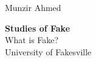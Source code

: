 \begin{titlepage} 
\AddToShipoutPictureBG*{\AtPageLowerLeft{%
  \color{accentcolour!75}\rule{.1\paperwidth}{\paperheight}}}
	\raggedright %

	\vspace*{\baselineskip} 
        
	\vspace{40mm}
        \hspace{15mm}
	{\Large Munzir Ahmed} 
	
	\vspace*{0.167\textheight} 
        \hspace{15mm}
	\textbf{\LARGE Studies of Fake}\\[\baselineskip] 
	\hspace{15mm}
	{\textcolor{accentcolour}{\Huge What is Fake?}}\\[\baselineskip] 
	\hspace{15mm}
	{\Large University of Fakesville}
	
	\vfill 

	
	\date{\today} 
	
	\vspace*{3\baselineskip} 

\end{titlepage}